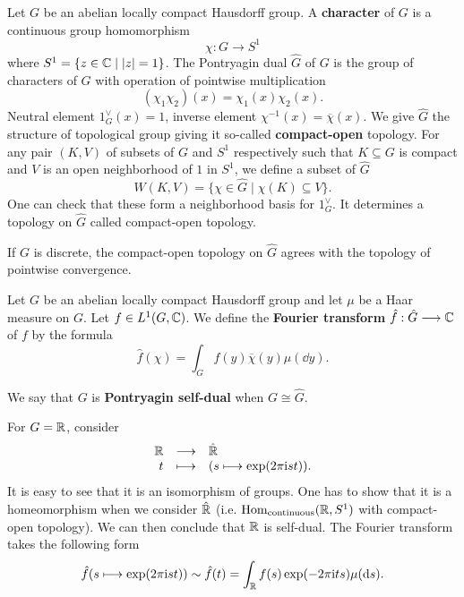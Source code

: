 \begin{definitionenv}
    Let $G$ be an abelian locally compact Hausdorff group.
    A \textbf{character} of $G$ is a continuous group homomorphism
    $$\chi : G \longrightarrow S^1$$
    where $S^1 = \{z \in \mathbb{C} \mid |z| = 1\}$.
    The Pontryagin dual $\hat{G}$ of $G$ is the group of characters of $G$ with operation of pointwise multiplication
    $$(\chi_1 \chi_2)(x) = \chi_1(x) \chi_2(x).$$
    Neutral element $1^\vee_{G} (x) = 1$, inverse element $\chi^{-1} (x) = \overline{\chi}(x)$.
    We give $\hat{G}$ the structure of topological group giving it so-called \textbf{compact-open} topology.
    For any pair $(K,V)$ of subsets of $G$ and $S^1$ respectively such that $K \subseteq G$ is compact and $V$ is an open neighborhood of $1$ in $S^1$, we define a subset of $\hat{G}$
    $$W(K,V) = \{\chi \in \hat{G} \mid \chi(K) \subseteq V\}.$$
    One can check that these form a neighborhood basis for $1^\vee_{G}$.
    It determines a topology on $\hat{G}$ called compact-open topology.
\end{definitionenv}

\begin{remark}
    If $G$ is discrete, the compact-open topology on $\hat{G}$ agrees with the topology of pointwise convergence.
\end{remark}

\begin{definitionenv}
    Let $G$ be an abelian locally compact Hausdorff group and let $\mu$ be a Haar measure on $G$.
    Let $f \in L^1(G,\mathbb{C})$.
    We define the \textbf{Fourier transform} $\hat{f} : \hat{G} \longrightarrow \mathbb{C}$ of $f$ by the formula
    $$\hat{f}(\chi) = \int_{G} f(y) \overline{\chi}(y)\mu(\dd y).$$
\end{definitionenv}

\begin{definitionenv}
    We say that $G$ is \textbf{Pontryagin self-dual} when $G \cong \hat{G}$.
\end{definitionenv}

\begin{exampleenv}
    For $G = \mathbb{R}$, consider
    $$\begin{array}{rcl}
        \mathbb{R} & \longrightarrow & \hat{\mathbb{R}}\\
        t & \longmapsto & (s \longmapsto \exp(2 \pi \mathrm{i} s t)).
    \end{array}$$
    It is easy to see that it is an isomorphism of groups.
    One has to show that it is a homeomorphism when we consider $\hat{\mathbb{R}}$ (i.e. $\operatorname{\mathrm{Hom}}_{\text{continuous}}(\mathbb{R},S^1)$ with compact-open topology).
    We can then conclude that $\mathbb{R}$ is self-dual.
    The Fourier transform takes the following form
    $$\hat{f} (s \longmapsto \exp(2 \pi \mathrm{i} s t)) \sim \hat{f}(t) = \int_{\mathbb{R}} f(s) \exp(-2 \pi \mathrm{i} t s) \mu(\mathrm{d} s).$$
\end{exampleenv}

